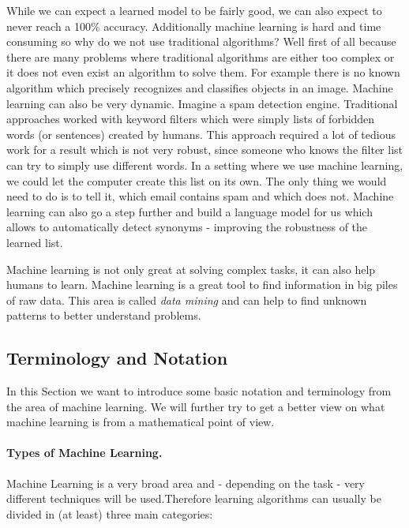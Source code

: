 While we can expect a learned model to be fairly good, we can also expect to never reach a 100\% accuracy. Additionally machine learning is hard and time consuming so why do we not use traditional algorithms? Well first of all because there are many problems where traditional algorithms are either too complex or it does not even exist an algorithm to solve them. For example there is no known algorithm which precisely recognizes and classifies objects in an image. Machine learning can also be very dynamic. Imagine a spam detection engine. Traditional approaches worked with keyword filters which were simply lists of forbidden words (or sentences) created by humans. This approach required a lot of tedious work for a result which is not very robust, since someone who knows the filter list can try to simply use different words. In a setting where we use machine learning, we could let the computer create this list on its own. The only thing we would need to do is to tell it, which email contains spam and which does not. Machine learning can also go a step further and build a language model for us which allows to automatically detect synonyms - improving the robustness of the learned list. 

Machine learning is not only great at solving complex tasks, it can also help humans to learn. Machine learning is a great tool to find information in big piles of raw data. This area is called \textit{data mining} and can help to find unknown patterns to better understand problems.

\subsection{Terminology and Notation} \label{ssec:MLNotation}
In this Section we want to introduce some basic notation and terminology from the area of machine learning. We will further try to get a better view on what machine learning is from a mathematical point of view.

\paragraph{Types of Machine Learning.} Machine Learning is a very broad area and - depending on the task - very different techniques will be used.Therefore learning algorithms can usually be divided in (at least) three main categories:

